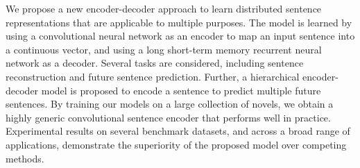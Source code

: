 We propose a new encoder-decoder approach to learn distributed sentence representations that are applicable to multiple purposes. The model is learned by using a convolutional neural network as an encoder to map an input sentence into a continuous vector, and using a long short-term memory recurrent neural network as a decoder. Several tasks are considered, including sentence reconstruction and future sentence prediction. Further, a hierarchical encoder-decoder model is proposed to encode a sentence to predict multiple future sentences. By training our models on a large collection of novels, we obtain a highly generic convolutional sentence encoder that performs well in practice. Experimental results on several benchmark datasets, and across a broad range of applications, demonstrate the superiority of the proposed model over competing methods.
